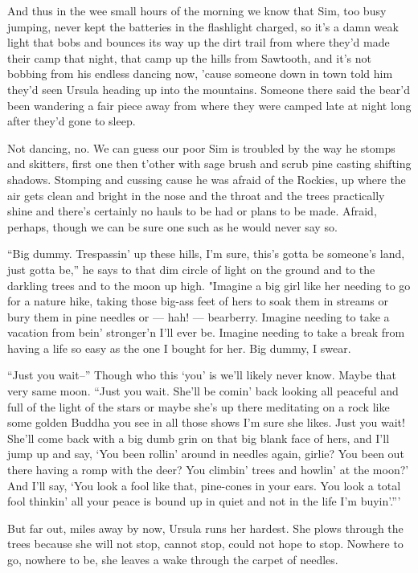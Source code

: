 And thus in the wee small hours of the morning we know that Sim, too busy jumping, never kept the batteries in the flashlight charged, so it's a damn weak light that bobs and bounces its way up the dirt trail from where they'd made their camp that night, that camp up the hills from Sawtooth, and it's not bobbing from his endless dancing now, 'cause someone down in town told him they'd seen Ursula heading up into the mountains. Someone there said the bear'd been wandering a fair piece away from where they were camped late at night long after they'd gone to sleep.

Not dancing, no. We can guess our poor Sim is troubled by the way he stomps and skitters, first one then t'other with sage brush and scrub pine casting shifting shadows. Stomping and cussing cause he was afraid of the Rockies, up where the air gets clean and bright in the nose and the throat and the trees practically shine and there's certainly no hauls to be had or plans to be made. Afraid, perhaps, though we can be sure one such as he would never say so.

``Big dummy. Trespassin' up these hills, I'm sure, this's gotta be someone's land, just gotta be,'' he says to that dim circle of light on the ground and to the darkling trees and to the moon up high. "Imagine a big girl like her needing to go for a nature hike, taking those big-ass feet of hers to soak them in streams or bury them in pine needles or --- hah! --- bearberry. Imagine needing to take a vacation from bein' stronger'n I'll ever be. Imagine needing to take a break from having a life so easy as the one I bought for her. Big dummy, I swear.

``Just you wait--'' Though who this `you' is we'll likely never know. Maybe that very same moon. ``Just you wait. She'll be comin' back looking all peaceful and full of the light of the stars or maybe she's up there meditating on a rock like some golden Buddha you see in all those shows I'm sure she likes. Just you wait! She'll come back with a big dumb grin on that big blank face of hers, and I'll jump up and say, `You been rollin' around in needles again, girlie? You been out there having a romp with the deer? You climbin' trees and howlin' at the moon?' And I'll say, `You look a fool like that, pine-cones in your ears. You look a total fool thinkin' all your peace is bound up in quiet and not in the life I'm buyin'.'''

But far out, miles away by now, Ursula runs her hardest. She plows through the trees because she will not stop, cannot stop, could not hope to stop. Nowhere to go, nowhere to be, she leaves a wake through the carpet of needles.

